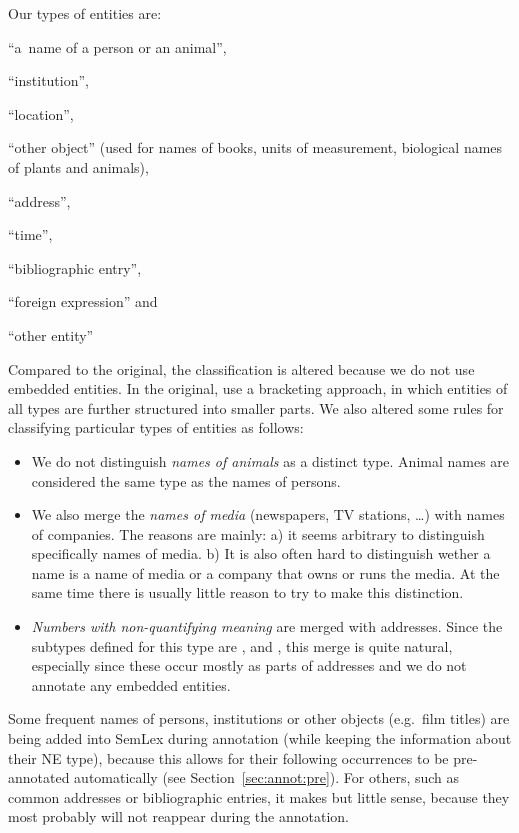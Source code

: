 Our types of entities are:
\begin{compactenum}
\item ``a~name of a person or an animal'', 
\item``institution'', 
\item``location'', 
\item``other object'' (used for names of books, units of measurement, biological names of plants and animals), 
\item``address'', 
\item``time'', 
\item``bibliographic entry'', 
\item``foreign expression'' and 
\item``other entity''
\end{compactenum}

Compared to the original, the classification is altered because we do not use embedded entities. In the original, \citeauthor{sevcikova:2007} use a bracketing approach, in which entities of all types are further structured into smaller parts. We also altered some rules for classifying particular types of entities as follows:
\begin{itemize}
\item  We do not distinguish \emph{names of animals} as a distinct type. Animal names are considered the same type as the names of persons.
\item We also merge the \emph{names of media} (newspapers, TV stations, \ldots) with names of companies. The reasons are mainly: a) it seems arbitrary to distinguish specifically names of media. b) It is also often hard to distinguish wether a name is a name of media or a company that owns or runs the media. At the same time there is usually little reason to try to make this distinction.
\item \emph{Numbers with non-quantifying meaning} are merged with addresses. Since the subtypes defined for this type are ,  and , this merge is quite natural, especially since these occur mostly as parts of addresses and we do not annotate any embedded entities.
\end{itemize}

Some frequent names of persons, institutions or other objects (e.g.~film titles) are being added into SemLex during annotation (while keeping the information about their NE type), because this allows for their following occurrences to be pre-annotated automatically (see Section~\ref{sec:annot:pre}). For others, such as common addresses or bibliographic entries, it makes but little sense, because they most probably will not reappear during the annotation. 

